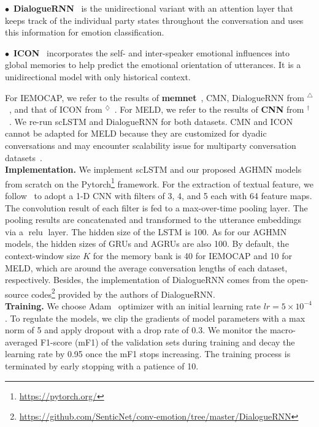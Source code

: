 \documentclass[letterpaper]{article} %
\DeclareMathOperator{\relu}{relu}
\begin{document}
$\bullet$~\textbf{DialogueRNN}~\cite{DBLP:conf/aaai/MajumderPHMGC19} is the unidirectional variant with an attention layer that keeps track of the individual party states throughout the conversation and uses this information for emotion classification.

$\bullet$~\textbf{ICON}~\cite{DBLP:conf/emnlp/HazarikaPMCZ18} incorporates the self- and inter-speaker emotional influences into global memories to help predict the emotional orientation of utterances. It is a unidirectional model with only historical context.

For IEMOCAP, we refer to the results of \textbf{memnet}~\cite{DBLP:conf/nips/SukhbaatarSWF15}, CMN, DialogueRNN from $^\triangle$~\cite{DBLP:conf/aaai/MajumderPHMGC19}, and that of ICON from $^\diamondsuit$~\cite{DBLP:conf/emnlp/HazarikaPMCZ18}. For MELD, we refer to the results of \textbf{CNN} from $^\dagger$~\cite{DBLP:journals/access/PoriaMMH19}. We re-run scLSTM and DialogueRNN for both datasets.
CMN and ICON cannot be adapted for MELD because they are customized for dyadic conversations and may encounter scalability issue for multiparty conversation datasets~\cite{DBLP:journals/access/PoriaMMH19}. 
\\[1ex]
\noindent\textbf{Implementation.}
We implement scLSTM and our proposed AGHMN models from scratch on the Pytorch\footnote{\url{https://pytorch.org/}} framework. For the extraction of textual feature, we follow~\cite{DBLP:conf/emnlp/HazarikaPMCZ18} to adopt a 1-D CNN with filters of 3, 4, and 5 each with 64 feature maps. The convolution result of each filter is fed to a max-over-time pooling layer. The pooling results are concatenated and transformed to the utterance embeddings via a $\relu$ layer. The hidden size of the LSTM is 100. As for our AGHMN models, the hidden sizes of GRUs and AGRUs are also 100. By default, the context-window size $K$ for the memory bank is 40 for IEMOCAP and 10 for MELD, which are around the average conversation lengths of each dataset, respectively. Besides, the implementation of DialogueRNN comes from the open-source codes\footnote{\url{https://github.com/SenticNet/conv-emotion/tree/master/DialogueRNN}} provided by the authors of DialogueRNN.
\\[1ex]
\noindent\textbf{Training.}
We choose Adam~\cite{DBLP:journals/corr/KingmaB14} optimizer with an initial learning rate $lr = 5\times 10^{-4}$. To regulate the models, we clip the gradients of model parameters with a max norm of 5 and apply dropout with a drop rate of 0.3. We monitor the macro-averaged F1-score (mF1) of the validation sets during training and decay the learning rate by 0.95 once the mF1 stops increasing. The training process is terminated by early stopping with a patience of 10.
\end{document}
